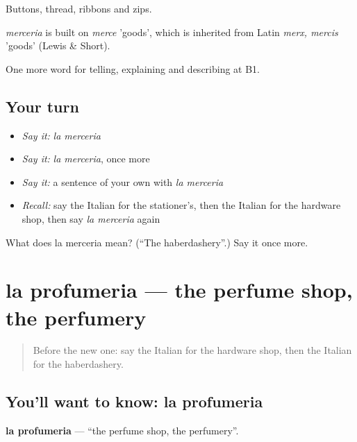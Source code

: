 Buttons, thread, ribbons and zips.

\begin{cousinweb}
\emph{merceria} is built on \emph{merce} 'goods', which is inherited from Latin \emph{merx, mercis} 'goods' (Lewis \& Short).
\end{cousinweb}

\begin{grammarlens}[title={What you've built}]
One more word for telling, explaining and describing at B1.
\end{grammarlens}

\subsection*{Your turn}
\begin{itemize}
\raggedright
  \item \emph{Say it:} \emph{la merceria}
  \item \emph{Say it:} \emph{la merceria}, once more
  \item \emph{Say it:} a sentence of your own with \emph{la merceria}
  \item \emph{Recall:} say the Italian for the stationer's, then the Italian for the hardware shop, then say \emph{la merceria} again
\end{itemize}

\begin{tcolorbox}[breakable,colback=teal!4,colframe=teal!35!black,title={Before you move on}]
What does la merceria mean? (\textquotedblleft{}The haberdashery\textquotedblright{}.) Say it once more.
\end{tcolorbox}
\section[la profumeria]{la profumeria — the perfume shop, the perfumery}

\label{lesson:IT-C453-profumeria}



\begin{quote}
Before the new one: say the Italian for the hardware shop, then the Italian for the haberdashery.
\end{quote}

\subsection*{You'll want to know: la profumeria}
\textbf{la profumeria} — \textquotedblleft{}the perfume shop, the perfumery\textquotedblright{}.

